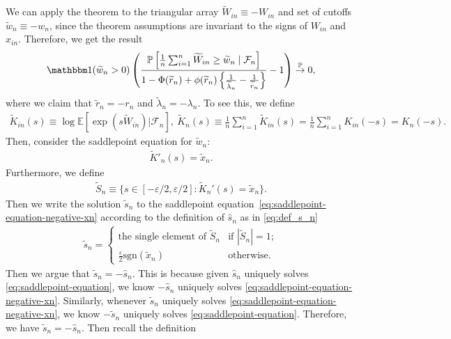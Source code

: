 \documentclass[12pt]{article}
\theoremstyle{definition}
\def\P{\mathbb{P}}
\def\P{\mathbb{P}}
\newcommand{\E}{\mathbb E}								%
\renewcommand{\P}{\mathbb{P}}							%
\newcommand{\indicator}{\mathbbm 1}						%
\newcommand{\convp}{\overset{\mathbb{P}}{\rightarrow}}             %
\begin{document}
We can apply the theorem to the triangular array $\widetilde W_{in} \equiv -W_{in}$ and set of cutoffs $\widetilde w_n \equiv -w_n$, since the theorem assumptions are invariant to the signs of $W_{in}$ and $x_{in}$. Therefore, we get the result
\begin{equation*}
\indicator(\widetilde w_n > 0)\left(\frac{\P\left[\frac1n \sum_{i = 1}^n \widetilde W_{in} \geq \widetilde w_n \mid \mathcal F_n\right]}{1-\Phi(\widetilde r_n)+\phi(\widetilde r_n)\left\{\frac{1}{\widetilde \lambda_n}-\frac{1}{\widetilde r_n}\right\}}-1\right) \convp 0,
\end{equation*}
where we claim that $\widetilde r_n = -r_n$ and $\widetilde \lambda_n = -\lambda_n$. To see this, we define
\begin{align*}
	\widetilde{K}_{in}(s)\equiv \log\E\left[\exp(s\widetilde W_{in})|\mathcal{F}_n\right],\ \widetilde{K}_n(s)\equiv \frac{1}{n}\sum_{i=1}^n\widetilde{K}_{in}(s) = \frac{1}{n}\sum_{i=1}^n K_{in}(-s)=K_n(-s).
\end{align*}
Then, consider the saddlepoint equation for $\widetilde w_n$:
\begin{align}\label{eq:saddlepoint-equation-negative-xn}
	\widetilde{K}'_n(s)=\widetilde{x}_n.
\end{align}
Furthermore, we define 
\begin{align*}
	\widetilde{S}_n\equiv \{s\in [-\varepsilon/2,\varepsilon/2]:\widetilde{K}_n'(s)=\widetilde{x}_n\}.
\end{align*}
Then we write the solution $\widetilde{s}_n$ to the saddlepoint equation~\eqref{eq:saddlepoint-equation-negative-xn} according to the definition of $\hat s_n$ as in \eqref{eq:def_s_n}
\begin{align*}
	\widetilde{s}_n=
	\begin{cases}
	\text{the single element of }\widetilde{S}_n & \text{if } |\widetilde{S}_n|=1; \\
	\frac{\varepsilon}{2}\mathrm{sgn}(\widetilde{x}_n) & \text{otherwise}.
	\end{cases}
\end{align*}
Then we argue that $\widetilde{s}_n=-\hat s_n$. This is because given $\hat s_n$ uniquely solves \eqref{eq:saddlepoint-equation}, we know $-\hat s_n$ uniquely solves \eqref{eq:saddlepoint-equation-negative-xn}. Similarly, whenever $\widetilde{s}_n$ uniquely solves \eqref{eq:saddlepoint-equation-negative-xn}, we know $-\widetilde{s}_n$ uniquely solves \eqref{eq:saddlepoint-equation}. Therefore, we have $\widetilde{s}_n=-\hat s_n$. Then recall the definition 
\end{document}
